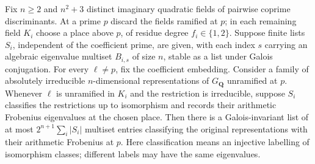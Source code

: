 \begin{lemma}\label{rk4:quadratic}
Fix \(n\ge2\) and \(n^2+3\) distinct imaginary quadratic fields of
pairwise coprime discriminants. At a prime \(p\) discard the fields
ramified at \(p\); in each remaining field \(K_i\) choose a place
above \(p\), of residue degree \(f_i\in\{1,2\}\). Suppose finite lists
\(S_i\), independent of the coefficient prime, are given, with each
index \(s\) carrying an algebraic eigenvalue multiset \(B_{i,s}\)
of size \(n\), stable as a list under Galois conjugation.
For every \(\ell\ne p\), fix the coefficient embedding. Consider a
family of absolutely irreducible \(n\)-dimensional representations of
\(G_{\mathbf Q}\) unramified at \(p\). Whenever \(\ell\) is unramified
in \(K_i\) and the restriction is irreducible, suppose \(S_i\)
classifies the restrictions up to isomorphism and records their
arithmetic Frobenius eigenvalues at the chosen place. Then there is a
Galois-invariant list of at most \(2^{n+1}\sum_i|S_i|\) multiset
entries classifying the original representations with their arithmetic
Frobenius at \(p\). Here classification means an injective labelling
of isomorphism classes; different labels may have the same eigenvalues.
\end{lemma}
